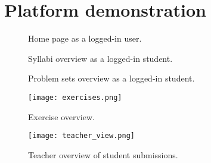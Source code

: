 \chapter{Platform demonstration} \label{chap:images}
\begin{figure}[H]
    \centering
    \caption{Home page as a logged-in user.}
    \label{fig:Home page}
\end{figure}

\begin{figure}[H]
    \centering
    \caption{Syllabi overview as a logged-in student.}
    \label{fig:syllabi}
\end{figure}

\begin{figure}[H]
    \centering
    \caption{Problem sets overview as a logged-in student.}
    \label{fig:problemsets}
\end{figure}

\begin{figure}[H]
    \centering
    \texttt{[image: exercises.png]}
    \caption{Exercise overview.}
    \label{fig:exercise_overview}
\end{figure}

\begin{figure}[H]
    \centering
    \texttt{[image: teacher\_view.png]}
    \caption{Teacher overview of student submissions.}
    \label{fig:teacher_overview.}
\end{figure}